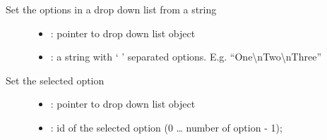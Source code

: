 \documentclass[letterpaper,10pt,english]{sphinxmanual}
\begin{document}
\begin{fulllineitems}
\label{\detokenize{object-types/ddlist:_CPPv421lv_ddlist_set_optionsP8lv_obj_tPKc}}%
\pysigstartmultiline
{}\label{\detokenize{object-types/ddlist:lv__ddlist_8h_1a236f49c5d0a2dd8bf5352056d4449bf5}}%
\pysigstopmultiline
Set the options in a drop down list from a string \begin{description}
\item[{}] \leavevmode\begin{itemize}
\item {} 
: pointer to drop down list object 

\item {} 
: a string with ‘
’ separated options. E.g. “One\textbackslash{}nTwo\textbackslash{}nThree” 


\end{itemize}

\end{description}


\end{fulllineitems}


\begin{fulllineitems}
\label{\detokenize{object-types/ddlist:_CPPv422lv_ddlist_set_selectedP8lv_obj_t8uint16_t}}%
\pysigstartmultiline
{}\label{\detokenize{object-types/ddlist:lv__ddlist_8h_1ab928c961d4349e0cb5a2e18ffa92287f}}%
\pysigstopmultiline
Set the selected option \begin{description}
\item[{}] \leavevmode\begin{itemize}
\item {} 
: pointer to drop down list object 

\item {} 
: id of the selected option (0 … number of option - 1); 

\end{itemize}

\end{description}


\end{fulllineitems}
\end{document}
